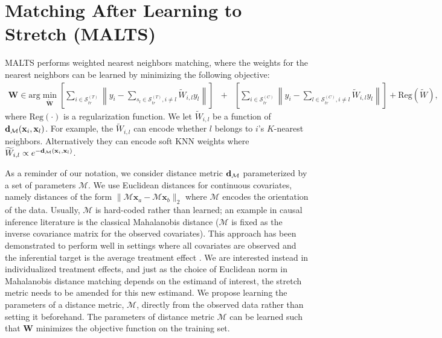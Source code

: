 \section{Matching After Learning to Stretch (MALTS)}\label{sec:method}

MALTS performs weighted nearest neighbors matching, where the weights for the nearest neighbors can be learned by minimizing the following objective:
\small
\begin{eqnarray*}
   \mathbf{W} \in \textrm{arg}\min_{\widetilde{\mathbf{W}}} \left[ \sum_{i \in \mathcal{S}^{(T)}_{tr}} \left\|y_{i} - \sum_{s_l \in \mathcal{S}^{(T)}_{tr}, i\neq l} \widetilde{W}_{i,l} y_{l}\right\| \right]
    &+& \left[\sum_{i \in \mathcal{S}^{(C)}_{tr}}  \left\|y_{i} - \sum_{l \in \mathcal{S}^{(C)}_{tr}, i\neq l} \widetilde{W}_{i,l} y_{l}\right\| \right]+ \textrm{Reg}(\widetilde{W}),
\end{eqnarray*}
\normalsize
where $\textrm{Reg}(\cdot)$ is a regularization function. We let $\widetilde{W}_{i,l}$ be a function of $\mathbf{d}_{\mathcal{M}}(\mathbf{x}_i,\mathbf{x}_l)$. For example, the $\widetilde{W}_{i,l}$ can encode whether $l$ belongs to $i$'s $K$-nearest neighbors. Alternatively they can encode soft $\textrm{KNN}$ weights where $\widetilde{W}_{i,l} \propto e^{-\mathbf{d}_{\mathcal{M}}(\mathbf{x}_i,\mathbf{x}_l)}$. 

As a reminder of our notation, we consider distance metric $\mathbf{d}_{\mathcal{M}}$ parameterized by a set of parameters $\mathcal{M}$.
We use Euclidean distances for continuous covariates, namely distances of the form $\|\mathcal{M} \mathbf{x}_a -\mathcal{M} \mathbf{x}_b\|_2$ where $\mathcal{M}$ encodes the orientation of the data. Usually, $\mathcal{M}$ is hard-coded rather than learned; an example in causal inference literature is the classical Mahalanobis distance ($\mathcal{M}$ is fixed as the inverse covariance matrix for the observed covariates). This approach has been demonstrated to perform well in settings where all covariates are observed and the inferential target is the average treatment effect \citep{stuart2010matching}. We are interested instead in individualized treatment effects, and just as the choice of Euclidean norm in Mahalanobis distance matching depends on the estimand of interest, the stretch metric needs to be amended for this new estimand. We propose learning the parameters of a distance metric, $\mathcal{M}$, directly from the observed data rather than setting it beforehand.
The parameters of distance metric $\mathcal{M}$ can be learned such that $\mathbf{W}$ minimizes the objective function on the training set. 


